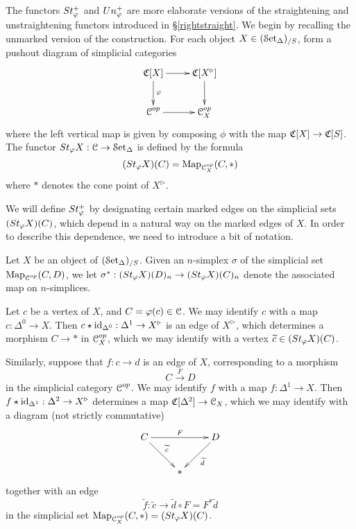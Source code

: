The functors $St^{+}_{\varphi}$ and $Un^{+}_{\varphi}$ are more elaborate versions of the straightening and unstraightening functors introduced in \S \ref{rightstraight}. We begin by recalling the unmarked version of the construction. For each object $X \in (\operatorname{\mathcal{S}et_{\Delta}})_{/S}$, form a pushout diagram of simplicial categories
$$ \xymatrix{ \sCoNerve[X] \ar[r] \ar[d]^{\phi} & \sCoNerve[X^{\triangleright}] \ar[d] \\
\calC^{op} \ar[r] & \calC^{op}_X }$$
where the left vertical map is given by composing $\phi$ with the map
$\operatorname{\mathfrak{C}}[X] \rightarrow \operatorname{\mathfrak{C}}[S]$. The functor
$St_{\varphi} X: \operatorname{\mathcal{C}} \rightarrow \operatorname{\mathcal{S}et_{\Delta}}$ is defined by the formula
$$ (St_{\varphi}X)(C) = \operatorname{{Map}}_{ \operatorname{\mathcal{C}}^{op}_X }(C, \ast)$$
where $\ast$ denotes the cone point of $X^{\triangleright}$.

We will define $St^{+}_{\varphi}$ by designating certain marked edges on the simplicial sets
$(St_{\varphi}X)(C)$, which depend in a natural way on the marked edges  of $X$.
In order to describe this dependence, we need to introduce a bit of notation.

\begin{notation}
Let $X$ be an object of $(\operatorname{\mathcal{S}et_{\Delta}})_{/S}$. Given an $n$-simplex $\sigma$ of the simplicial set
$\operatorname{{Map}}_{\operatorname{\mathcal{C}}^{op}}(C,D)$, we let $\sigma^{\ast}: (St_{\varphi}X)(D)_n \rightarrow
(St_{\varphi}X)(C)_n$ denote the associated map on $n$-simplices.

Let $c$ be a vertex of $X$, and $C = \varphi(c) \in \operatorname{\mathcal{C}}$.
We may identify $c$ with a map $c: \Delta^0 \rightarrow X$.
Then $c \star \operatorname{id}_{\Delta^0}: \Delta^1 \rightarrow X^{\triangleright}$ is an edge of
$X^{\triangleright}$, which determines a morphism $C \rightarrow \ast$ in
$\operatorname{\mathcal{C}}^{op}_X$, which we may identify with a vertex $\widetilde{c} \in (St_{\varphi}X)(C)$.

Similarly, suppose that $f: c \rightarrow d$ is an edge of $X$, corresponding to a morphism
$$ C \stackrel{F}{\rightarrow} D$$ in the simplicial category $\operatorname{\mathcal{C}}^{op}$.
We may identify $f$ with a map $f: \Delta^1\rightarrow X$. Then $f \star \operatorname{id}_{\Delta^1}: \Delta^2 \rightarrow X^{\triangleright}$ determines a map $\operatorname{\mathfrak{C}}[\Delta^2] \rightarrow \operatorname{\mathcal{C}}_X$, which we may identify with a diagram (not strictly commutative)
$$ \xymatrix{ C \ar[rr]^{F} \ar[dr]^{\widetilde{c}} & & D \ar[dl]^{\widetilde{d}} \\
& \ast & }$$
together with an edge $$\widetilde{f}: \widetilde{c} \rightarrow \widetilde{d} \circ F = F^{\ast} 
\widetilde{d}$$
in the simplicial set $\operatorname{{Map}}_{\operatorname{\mathcal{C}}^{op}_X}(C, \ast) = (St_{\varphi}X)(C)$.
\end{notation}


